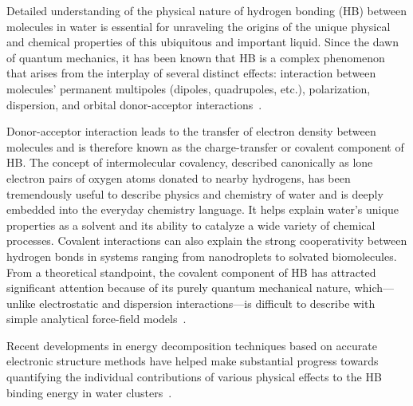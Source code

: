 \documentclass[10pt,amsmath,twocolumn,aps,prl,superscriptaddress,floatfix]{revtex4-1}
\begin{document}
Detailed understanding of the physical nature of hydrogen bonding (HB) between molecules in water is essential for unraveling the origins of the unique physical and chemical properties of this ubiquitous and important liquid. 
Since the dawn of quantum mechanics, it has been known that HB is a complex phenomenon that arises from the interplay of several distinct effects: interaction between molecules' permanent multipoles (dipoles, quadrupoles, etc.), polarization, dispersion, and orbital donor-acceptor interactions~\cite{eisenberg2005structure}.

Donor-acceptor interaction leads to the transfer of electron density between molecules and is therefore known as the charge-transfer or covalent component of HB. 
The concept of intermolecular covalency, described canonically as lone electron pairs of oxygen atoms donated to nearby hydrogens, has been tremendously useful to describe physics and chemistry of water and is deeply embedded into the everyday chemistry language. 
It helps explain water's unique properties as a solvent and its ability to catalyze a wide variety of chemical processes. Covalent interactions can also explain the strong cooperativity between hydrogen bonds in systems ranging from nanodroplets to solvated biomolecules. 
From a theoretical standpoint, the covalent component of HB has attracted significant attention because of its purely quantum mechanical nature, which---unlike electrostatic and dispersion interactions---is difficult to describe with simple analytical force-field models~\cite{lee2011effects, gordon2013accurate}.

Recent developments in energy decomposition techniques based on accurate electronic structure methods have helped make substantial progress towards quantifying the individual contributions of various physical effects to the HB binding energy in water clusters~\cite{stevens1987frozen, stone1993computation, chen1996energy, schenter1996natural, glendening2005natural, weinhold2005resonance, piquemal2005csov, khaliullin2009electron, cobar2012examination, guevara2016hydrogen}. 
\end{document}

